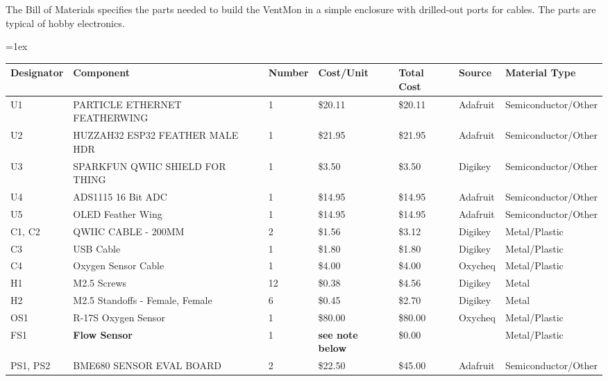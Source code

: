 \documentclass[11pt, letterpaper]{article}
\begin{document}


The Bill of Materials specifies the parts needed to build the VentMon in a simple enclosure with drilled-out ports for cables.
The parts are typical of hobby electronics.

\tabulinesep=1ex
\begin{tabu} to \linewidth {|X[0.5]|X[3]|X[0.5]|X|X|X|X[3]|}
  \hline
\textbf{ Designator} &	\textbf{Component} & \textbf{Number} & \textbf{Cost/Unit} & \textbf{Total Cost}& \textbf{Source} & \textbf{Material Type} \\\hline
U1 &	PARTICLE ETHERNET FEATHERWING &	1 &	\$20.11 &	\$20.11  &	Adafruit &	Semiconductor/Other \\\hline
U2 &	HUZZAH32 ESP32 FEATHER MALE HDR	& 1 &	\$21.95	& \$21.95 &	Adafruit&	Semiconductor/Other \\\hline
U3 &	SPARKFUN QWIIC SHIELD FOR THING	& 1 &	\$3.50	& \$3.50 &	Digikey	& Semiconductor/Other \\\hline
U4 &	ADS1115 16 Bit ADC &	1&	\$14.95	& \$14.95 &	Adafruit	& Semiconductor/Other \\\hline
U5 &	OLED Feather Wing &	1&	\$14.95	& \$14.95 &	Adafruit &	Semiconductor/Other \\\hline
C1, C2 &	QWIIC CABLE - 200MM &	2 &	\$1.56 &	\$3.12 &	Digikey	& Metal/Plastic \\\hline
C3 &	USB Cable &	1 &	\$1.80 &	\$1.80	& Digikey &	Metal/Plastic \\\hline
C4 &	Oxygen Sensor Cable &	1 &	\$4.00 &	\$4.00 &	Oxycheq &	Metal/Plastic \\\hline
H1 &	M2.5 Screws &	12 &	\$0.38	& \$4.56 &	Digikey	& Metal \\\hline
H2 &	M2.5 Standoffs - Female, Female	& 6 &	\$0.45 &	\$2.70	& Digikey &	Metal \\\hline
OS1 &	R-17S Oxygen Sensor &	1 &	\$80.00 &	\$80.00	 & Oxycheq &	Metal/Plastic \\\hline
FS1 &	\textbf{Flow Sensor} &	1 & \textbf{see note below}	&	\$0.00	& &	Metal/Plastic \\\hline
PS1, PS2 &	BME680 SENSOR EVAL BOARD &	2 &	\$22.50 &	\$45.00	& Adafruit &	Semiconductor/Other \\\hline

\end{tabu}
\end{document}
